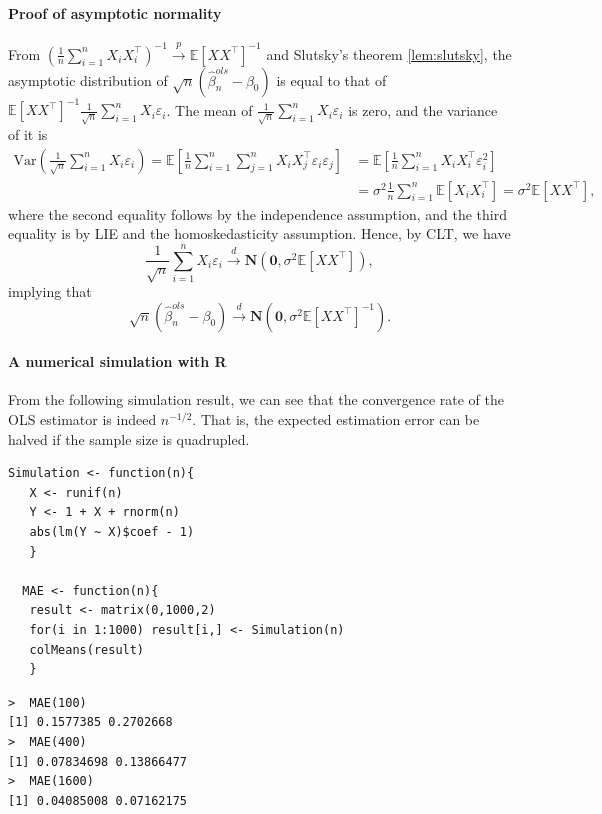 \documentclass[10.5pt, A4paper, openany, uplatex]{book}
\newcommand{\mbf}{\mathbf}
\newcommand{\eps}{\varepsilon}
\newcommand{\E}{\mathbb{E}}
\newcommand{\Var}{\mathrm{Var}}
\renewcommand{\hat}{\widehat}
\numberwithin{equation}{section}
\begin{document}
\paragraph{Proof of asymptotic normality}

From $\left(\frac{1}{n}\sum_{i = 1}^n X_i X_i^\top \right)^{-1} \overset{p}{\to} \E[XX^\top]^{-1}$ and Slutsky's theorem \ref{lem:slutsky}, the asymptotic distribution of  $\sqrt{n}(\hat \beta_n^{ols} - \beta_0)$ is equal to that of $\E[XX^\top]^{-1}\frac{1}{\sqrt{n}}\sum_{i = 1}^n X_i \eps_i$.
The mean of $\frac{1}{\sqrt{n}}\sum_{i = 1}^n X_i \eps_i$ is zero, and the variance of it is
\begin{align*}
	\Var\left(\frac{1}{\sqrt{n}}\sum_{i = 1}^n X_i \eps_i\right) 
	= \E\left[ \frac{1}{n}\sum_{i = 1}^n\sum_{j = 1}^n X_i X_j^\top \eps_i \eps_j \right]
	& = \E\left[ \frac{1}{n}\sum_{i = 1}^n X_iX_i^\top \eps^2_i \right]\\
	& = \sigma^2 \frac{1}{n}\sum_{i = 1}^n  \E[  X_iX_i^\top ] = \sigma^2 \E[  XX^\top ],
\end{align*}
where the second equality follows by the independence assumption, and the third equality is by LIE and the homoskedasticity assumption.
Hence, by CLT, we have
\[
	\frac{1}{\sqrt{n}}\sum_{i = 1}^n X_i \eps_i \overset{d}{\to} \mbf{N}(\mbf{0}, \sigma^2 \E[XX^\top]),
\]
implying that 
\[
	\sqrt{n}(\hat \beta_n^{ols} - \beta_0) \overset{d}{\to} \mbf{N}(\mbf{0}, \sigma^2 \E[XX^\top]^{-1}).
\]

\paragraph{A numerical simulation with R}

From the following simulation result, we can see that the convergence rate of the OLS estimator is indeed $n^{-1/2}$.
That is, the expected estimation error can be halved if the sample size is quadrupled.

\begin{lstlisting}[basicstyle=\ttfamily\footnotesize, frame=single]
  Simulation <- function(n){
   X <- runif(n)
   Y <- 1 + X + rnorm(n)
   abs(lm(Y ~ X)$coef - 1)
   }
	
  MAE <- function(n){
   result <- matrix(0,1000,2)
   for(i in 1:1000) result[i,] <- Simulation(n)
   colMeans(result)
   }
\end{lstlisting}

\begin{lstlisting}[basicstyle=\ttfamily\footnotesize, frame=single]
>  MAE(100)
[1] 0.1577385 0.2702668
>  MAE(400)
[1] 0.07834698 0.13866477
>  MAE(1600)
[1] 0.04085008 0.07162175
\end{lstlisting}
\end{document}
